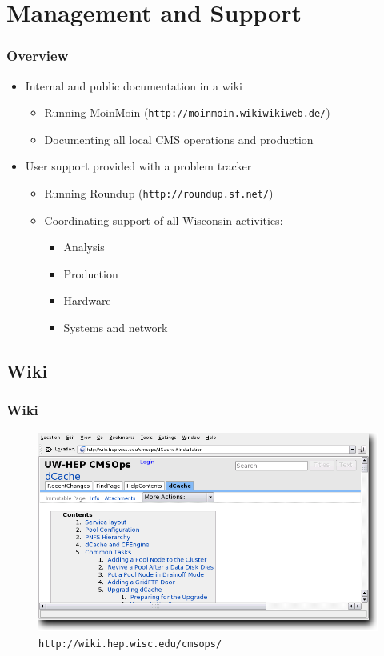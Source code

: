 \documentclass{beamer}
\begin{document}

\section{Management and Support}
\begin{frame}
\frametitle{Overview}
\begin{itemize}
    \item Internal and public documentation in a wiki
    \begin{itemize}
        \item Running MoinMoin ({\tt http://moinmoin.wikiwikiweb.de/})
        \item Documenting all local CMS operations and production
    \end{itemize}
    \item User support provided with a problem tracker
    \begin{itemize}
        \item Running Roundup ({\tt http://roundup.sf.net/})
        \item Coordinating support of all Wisconsin activities:
        \begin{itemize}
            \item Analysis
            \item Production
            \item Hardware
            \item Systems and network
        \end{itemize}
    \end{itemize}
\end{itemize}
\end{frame}

\subsection{Wiki}
\begin{frame}
\frametitle{Wiki}
\begin{figure}
    \includegraphics*{Graphics/wiki.png}
    \caption{{\tt http://wiki.hep.wisc.edu/cmsops/}}
\end{figure}
\end{frame}
\end{document}
